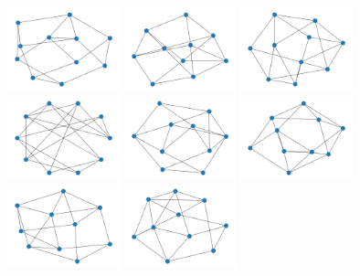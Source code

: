 \includegraphics[width=3.25cm]{images/mfms/f4_28.png}
\includegraphics[width=3.25cm]{images/mfms/f4_29.png}
\includegraphics[width=3.25cm]{images/mfms/f4_30.png}
\includegraphics[width=3.25cm]{images/mfms/f4_31.png}
\includegraphics[width=3.25cm]{images/mfms/f4_32.png}
\includegraphics[width=3.25cm]{images/mfms/f4_33.png}
\includegraphics[width=3.25cm]{images/mfms/f4_34.png}
\includegraphics[width=3.25cm]{images/mfms/f4_35.png}
